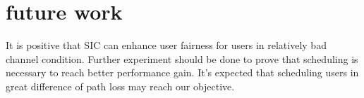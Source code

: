 \section{future work}
\label{future_work}
It is positive that SIC can enhance user fairness for users in
relatively bad channel condition.
Further experiment should be done to prove that scheduling is
necessary to reach better performance gain.
It's expected that scheduling users in great difference of path
loss may reach our objective.